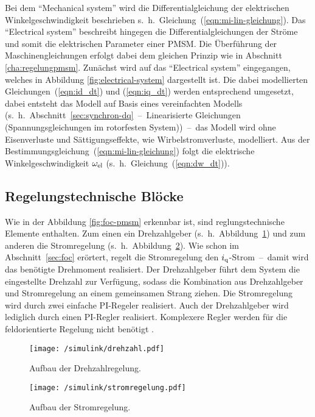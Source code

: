 Bei dem \enquote{Mechanical system} wird die Differentialgleichung der elektrischen Winkelgeschwindigkeit beschrieben s.~h.~Gleichung~(\ref{eqn:mi-lin-gleichung}).
Das \enquote{Electrical system} beschreibt hingegen die Differentialgleichungen der Ströme und somit die elektrischen Parameter einer PMSM.
Die Überführung der Maschinengleichungen erfolgt dabei dem gleichen Prinzip wie in Abschnitt \ref{cha:regelungpmsm}.
Zunächst wird auf das \enquote{Electrical system} eingegangen, welches in Abbildung \ref{fig:electrical-system} dargestellt ist.
Die dabei modellierten Gleichungen~(\ref{eqn:id_dt}) und (\ref{eqn:iq_dt}) werden entsprechend umgesetzt, dabei entsteht das Modell auf Basis eines vereinfachten Modells (s.~h.~Abschnitt~\ref{sec:synchron-dq}~--~Linearisierte Gleichungen (Spannungsgleichungen im rotorfesten System))~--~das Modell wird ohne Eisenverluste und Sättigungseffekte, wie Wirbelstromverluste, modelliert.
Aus der Bestimmungsgleichung~(\ref{eqn:mi-lin-gleichung}) folgt die elektrische Winkelgeschwindigkeit $\omega_{\mathrm{el}}$ (s.~h.~Gleichung~(\ref{eqn:dw_dt})).

\subsection{Regelungstechnische Blöcke}

Wie in der Abbildung \ref{fig:foc-pmsm} erkennbar ist, sind reglungstechnische Elemente enthalten.
Zum einen ein Drehzahlgeber (s.~h.~Abbildung~\ref{fig:drehzahl}) und zum anderen die Stromregelung (s.~h.~Abbildung~\ref{fig:stromregelung}).
Wie schon im Abschnitt~\ref{sec:foc} erörtert, regelt die Stromregelung den $i_{\mathrm{q}}$-Strom~--~damit wird das benötigte Drehmoment realisiert.
Der Drehzahlgeber führt dem System die eingestellte Drehzahl zur Verfügung, sodass die Kombination aus Drehzahlgeber und Stromregelung an einem gemeinsamen Strang ziehen.
Die Stromregelung wird durch zwei einfache PI-Regeler realisiert.
Auch der Drehzahlgeber wird lediglich durch einen PI-Regler realisiert.
Komplexere Regler werden für die feldorientierte Regelung nicht benötigt \autocites{Perassi2006}{kellner2012}.

\begin{figure}[h]
	\centering
	\texttt{[image: /simulink/drehzahl.pdf]}
	\label{fig:drehzahl}
	\caption{Aufbau der Drehzahlregelung.}
\end{figure}

\begin{figure}[h]
	\centering
	\texttt{[image: /simulink/stromregelung.pdf]}
	\label{fig:stromregelung}
	\caption{Aufbau der Stromregelung.}
\end{figure}

